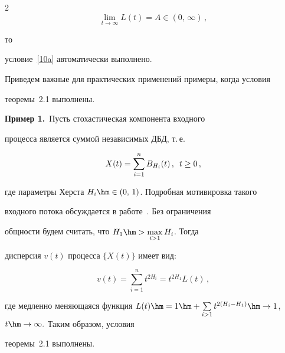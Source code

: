 \begin{multicols}{2}
\begin{equation}
\lim\limits_{t\to \infty} L(t)= A\in (0,\,\infty)\,,


\label{38}


\end{equation}


то


условие~\eqref{10a} автоматически вы\-пол\-нено.





\smallskip





Приведем важные для практических применений примеры, когда условия


теоремы~2.1 вы\-пол\-нены.





\smallskip





\noindent


\textbf{Пример 1.}\ Пусть стохастическая компонента входного


процесса является суммой независимых ДБД, т.\,е.


\begin{equation*}


X(t)=\sum\limits_{i=1}^n B_{H_i}(t)\,, \enskip t\ge 0\,,




\end{equation*}


где параметры Херста $H_i\hm\in (0,\,1)$. Подробная мотивировка такого


входного потока обсуждается  в работе~\cite{Taqqu}.  Без ограничения


общности будем считать, что $H_1\hm>\max\limits_{i>1}H_i$. Тогда


 дисперсия $v(t)$  процесса $\{X(t)\}$  имеет вид:


$$


v(t)=\sum\limits_{i=1}^n t^{2H_i}=t^{2H_1}L(t)\,,


$$


где медленно меняющаяся функция $ L(t)\hm=1\hm+\sum\limits_{i>1}


t^{2(H_i-H_1)}\hm\to 1$, $t \hm\to \infty. $ Таким образом, условия


теоремы~2.1 выполнены.





\smallskip






\end{multicols}
